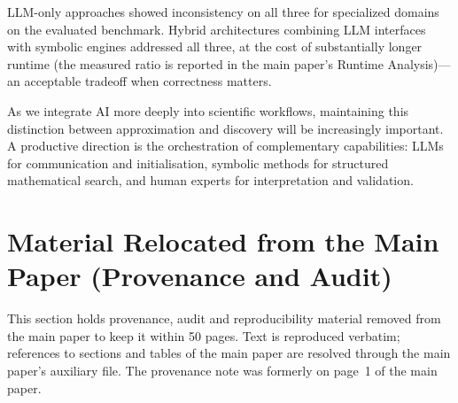 \documentclass[twoside,11pt]{article}
\begin{document}
LLM-only approaches showed inconsistency on all three for specialized domains on the evaluated benchmark. Hybrid architectures combining LLM interfaces with symbolic engines addressed all three, at the cost of substantially longer runtime (the measured ratio is reported in the main paper's Runtime Analysis)---an acceptable tradeoff when correctness matters.

As we integrate AI more deeply into scientific workflows, maintaining this distinction between approximation and discovery will be increasingly important. A productive direction is the orchestration of complementary capabilities: LLMs for communication and initialisation, symbolic methods for structured mathematical search, and human experts for interpretation and validation.






\providecommand{\Rsq}{R^{2}}
\section{Material Relocated from the Main Paper (Provenance and Audit)}\label{sec:relocated_audit}
This section holds provenance, audit and reproducibility material removed from the main paper to keep it within 50 pages. Text is reproduced verbatim; references to sections and tables of the main paper are resolved through the main paper's auxiliary file. The provenance note was formerly on page~1 of the main paper.
\end{document}
